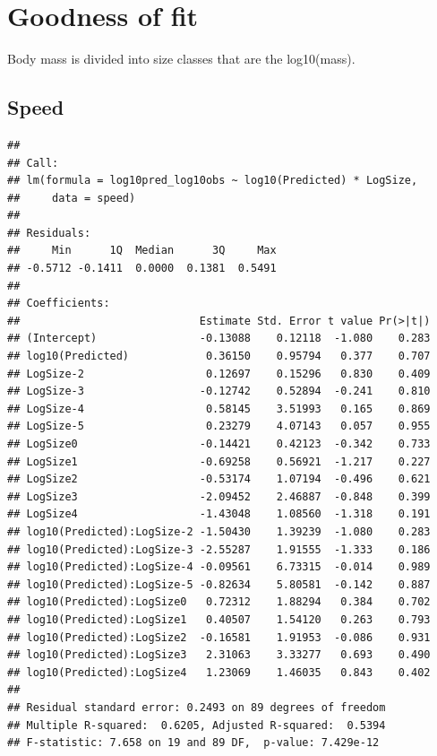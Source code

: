 \hypertarget{goodness-of-fit}{%
\section{Goodness of fit}\label{goodness-of-fit}}

Body mass is divided into size classes that are the log10(mass).

\hypertarget{speed}{%
\subsection{Speed}\label{speed}}

\begin{verbatim}
## 
## Call:
## lm(formula = log10pred_log10obs ~ log10(Predicted) * LogSize, 
##     data = speed)
## 
## Residuals:
##     Min      1Q  Median      3Q     Max 
## -0.5712 -0.1411  0.0000  0.1381  0.5491 
## 
## Coefficients:
##                            Estimate Std. Error t value Pr(>|t|)
## (Intercept)                -0.13088    0.12118  -1.080    0.283
## log10(Predicted)            0.36150    0.95794   0.377    0.707
## LogSize-2                   0.12697    0.15296   0.830    0.409
## LogSize-3                  -0.12742    0.52894  -0.241    0.810
## LogSize-4                   0.58145    3.51993   0.165    0.869
## LogSize-5                   0.23279    4.07143   0.057    0.955
## LogSize0                   -0.14421    0.42123  -0.342    0.733
## LogSize1                   -0.69258    0.56921  -1.217    0.227
## LogSize2                   -0.53174    1.07194  -0.496    0.621
## LogSize3                   -2.09452    2.46887  -0.848    0.399
## LogSize4                   -1.43048    1.08560  -1.318    0.191
## log10(Predicted):LogSize-2 -1.50430    1.39239  -1.080    0.283
## log10(Predicted):LogSize-3 -2.55287    1.91555  -1.333    0.186
## log10(Predicted):LogSize-4 -0.09561    6.73315  -0.014    0.989
## log10(Predicted):LogSize-5 -0.82634    5.80581  -0.142    0.887
## log10(Predicted):LogSize0   0.72312    1.88294   0.384    0.702
## log10(Predicted):LogSize1   0.40507    1.54120   0.263    0.793
## log10(Predicted):LogSize2  -0.16581    1.91953  -0.086    0.931
## log10(Predicted):LogSize3   2.31063    3.33277   0.693    0.490
## log10(Predicted):LogSize4   1.23069    1.46035   0.843    0.402
## 
## Residual standard error: 0.2493 on 89 degrees of freedom
## Multiple R-squared:  0.6205, Adjusted R-squared:  0.5394 
## F-statistic: 7.658 on 19 and 89 DF,  p-value: 7.429e-12
\end{verbatim}


